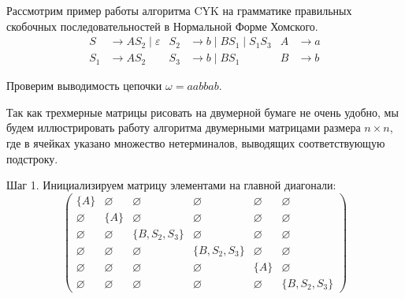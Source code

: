 \begin{example}\label{exampl:CYK}
    Рассмотрим пример работы алгоритма CYK на грамматике правильных скобочных последовательностей в Нормальной Форме Хомского.
    \begin{align*}
        S   & \to A S_2 \mid \varepsilon & S_2 & \to b \mid B S_1 \mid S_1 S_3 & A & \to a \\
        S_1 & \to A S_2                  & S_3 & \to b \mid B S_1              & B & \to b
    \end{align*}

    Проверим выводимость цепочки $\omega = a a b b a b$.

    Так как трехмерные матрицы рисовать на двумерной бумаге не очень удобно, мы будем иллюстрировать работу алгоритма двумерными матрицами размера $n \times n$, где в ячейках указано множество нетерминалов, выводящих соответствующую подстроку.

    Шаг 1.
    Инициализируем матрицу элементами на главной диагонали:
    \[
        \begin{pmatrix}
            \{A\}       & \varnothing & \varnothing     & \varnothing     & \varnothing & \varnothing     \\
            \varnothing & \{A\}       & \varnothing     & \varnothing     & \varnothing & \varnothing     \\
            \varnothing & \varnothing & \{B, S_2, S_3\} & \varnothing     & \varnothing & \varnothing     \\
            \varnothing & \varnothing & \varnothing     & \{B, S_2, S_3\} & \varnothing & \varnothing     \\
            \varnothing & \varnothing & \varnothing     & \varnothing     & \{A\}       & \varnothing     \\
            \varnothing & \varnothing & \varnothing     & \varnothing     & \varnothing & \{B, S_2, S_3\}
        \end{pmatrix}
    \]


\end{example}
